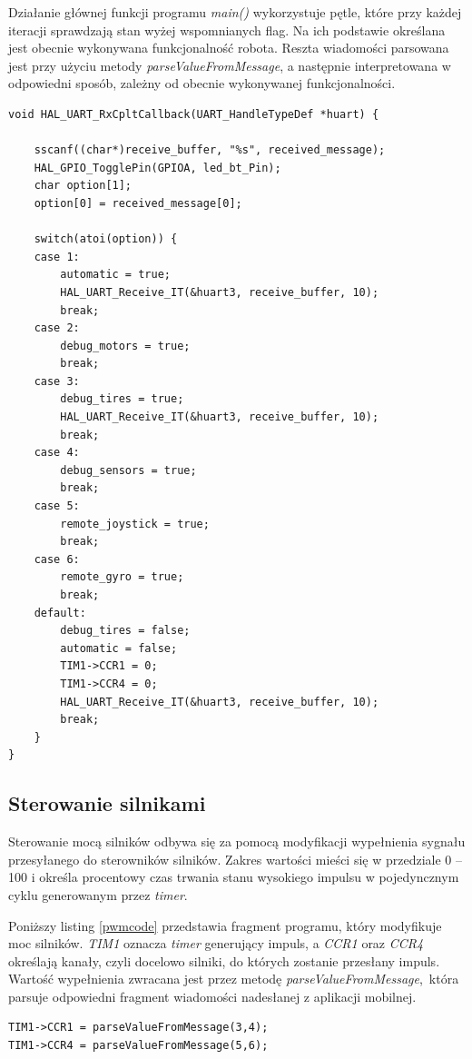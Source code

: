 Działanie głównej funkcji programu \textit{main()} wykorzystuje pętle, które przy każdej iteracji sprawdzają stan wyżej wspomnianych flag. Na ich podstawie określana jest obecnie wykonywana funkcjonalność robota. Reszta wiadomości parsowana jest przy użyciu metody \textit{parseValueFromMessage}, a następnie interpretowana w odpowiedni sposób, zależny od obecnie wykonywanej funkcjonalności.

\begin{minipage}{\textwidth}
	\begin{lstlisting}[label=interruptcode,caption=Funkcja obsługująca przerwanie.]
void HAL_UART_RxCpltCallback(UART_HandleTypeDef *huart) {

	sscanf((char*)receive_buffer, "%s", received_message);
	HAL_GPIO_TogglePin(GPIOA, led_bt_Pin);
	char option[1];
	option[0] = received_message[0];

	switch(atoi(option)) {
	case 1:
		automatic = true;
		HAL_UART_Receive_IT(&huart3, receive_buffer, 10);
		break;
	case 2:
		debug_motors = true;
		break;
	case 3:
		debug_tires = true;
		HAL_UART_Receive_IT(&huart3, receive_buffer, 10);
		break;
	case 4:
		debug_sensors = true;
		break;
	case 5:
		remote_joystick = true;
		break;
	case 6:
		remote_gyro = true;
		break;
	default:
		debug_tires = false;
		automatic = false;
		TIM1->CCR1 = 0;
		TIM1->CCR4 = 0;
		HAL_UART_Receive_IT(&huart3, receive_buffer, 10);
	    break;
	}
}
	\end{lstlisting}
\end{minipage}
 
\subsection{Sterowanie silnikami}
Sterowanie mocą silników odbywa się za pomocą modyfikacji wypełnienia sygnału przesyłanego do sterowników silników. Zakres wartości mieści się w przedziale 0 – 100 i określa procentowy czas trwania stanu wysokiego impulsu w pojedyncznym cyklu generowanym przez \textit{timer}. 

Poniższy listing \ref{pwmcode} przedstawia fragment programu, który modyfikuje moc silników. \textit{TIM1} oznacza \textit{timer} generujący impuls, a \textit{CCR1} oraz \textit{CCR4} określają kanały, czyli docelowo silniki, do których zostanie przesłany impuls.  Wartość wypełnienia zwracana jest przez metodę \textit{parseValueFromMessage},~która parsuje odpowiedni fragment wiadomości nadesłanej z aplikacji mobilnej. 

\begin{minipage}{\textwidth}
	\begin{lstlisting}[label=pwmcode,caption=Sterowanie mocą silników.]
TIM1->CCR1 = parseValueFromMessage(3,4);
TIM1->CCR4 = parseValueFromMessage(5,6);
	\end{lstlisting}
\end{minipage}

